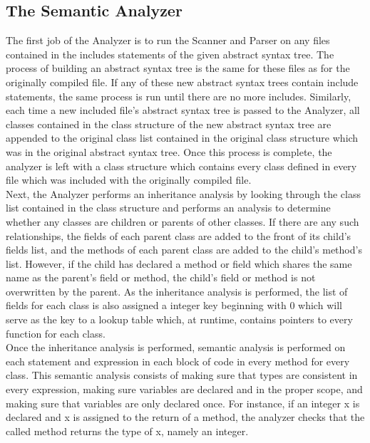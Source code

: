 \begin{homeworkProblem}
	\subsection{The Semantic Analyzer}
	The first job of the Analyzer is to run the Scanner and Parser on any files contained in the includes statements of the given abstract syntax tree. The process of building an abstract syntax tree is the same for these files as for the originally compiled file. If any of these new abstract syntax trees contain include statements, the same process is run until there are no more includes. Similarly, each time a new included file's abstract syntax tree is passed to the Analyzer, all classes contained in the class structure of the new abstract syntax tree are appended to the original class list contained in the original class structure which was in the original abstract syntax tree. Once this process is complete, the analyzer is left with a class structure which contains every class defined in every file which was included with the originally compiled file.\\
	Next, the Analyzer performs an inheritance analysis by looking through the class list contained in the class structure and performs an analysis to determine whether any classes are children or parents of other classes. If there are any such relationships, the fields of each parent class are added to the front of its child's fields list, and the methods of each parent class are added to the child's method's list. However, if the child has declared a method or field which shares the same name as the parent's field or method, the child's field or method is not overwritten by the parent. As the inheritance analysis is performed, the list of fields for each class is also assigned a integer key beginning with 0 which will serve as the key to a lookup table which, at runtime, contains pointers to every function for each class.\\
	Once the inheritance analysis is performed, semantic analysis is performed on each statement and expression in each block of code in every method for every class. This semantic analysis consists of making sure that types are consistent in every expression, making sure variables are declared and in the proper scope, and making sure that variables are only declared once. For instance, if an integer x is declared and x is assigned to the return of a method, the analyzer checks that the called method returns the type of x, namely an integer.\\

\end{homeworkProblem}

